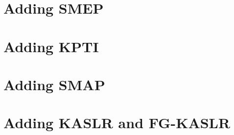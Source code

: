 \documentclass{masterthesis}
\begin{document}
\section{Adding SMEP}

\section{Adding KPTI}

\section{Adding SMAP}

\section{Adding KASLR and FG-KASLR}
\end{document}
